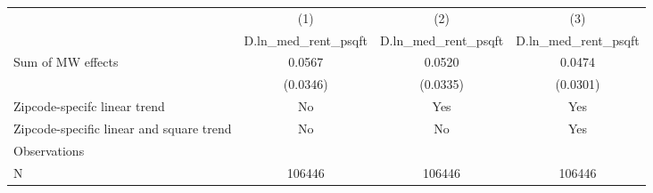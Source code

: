 {
\def\sym#1{\ifmmode^{#1}\else\(^{#1}\)\fi}
\begin{tabular}{l*{3}{c}}
\hline\hline
          &\multicolumn{1}{c}{(1)}&\multicolumn{1}{c}{(2)}&\multicolumn{1}{c}{(3)}\\
          &\multicolumn{1}{c}{D.ln\_med\_rent\_psqft}&\multicolumn{1}{c}{D.ln\_med\_rent\_psqft}&\multicolumn{1}{c}{D.ln\_med\_rent\_psqft}\\
\hline
Sum of MW effects&   0.0567         &   0.0520         &   0.0474         \\
          & (0.0346)         & (0.0335)         & (0.0301)         \\
\hline
Zipcode-specifc linear trend&       No         &      Yes         &      Yes         \\
Zipcode-specific linear and square trend&       No         &       No         &      Yes         \\
Observations&                  &                  &                  \\
N         &   106446         &   106446         &   106446         \\
\hline\hline
\end{tabular}
}
